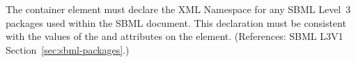 The  container element must declare the XML Namespace for any
SBML Level~3 packages used within the SBML document.  This declaration must
be consistent with the values of the  and 
attributes on the  element.  (References: SBML L3V1
Section~\ref{sec:sbml-packages}.)
